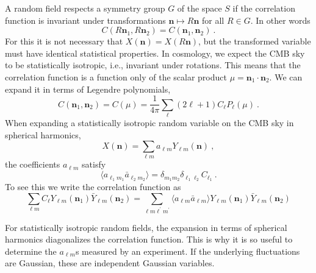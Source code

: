 \documentclass[12pt,a4paper]{article}
\renewcommand{\vec}[1]{\boldsymbol{#1}}
\begin{document}
A random field respects a symmetry group $G$ of the space $S$ if the correlation function is invariant under transformations $\vec{n} \mapsto R\vec{n}$ for all $R \in G$. In other words
\begin{equation}
C(R\vec{n}_1, R\vec{n}_2) = C(\vec{n}_1, \vec{n}_2) ~.
\end{equation}
For this it is not necessary that $X(\vec{n}) = X(R\vec{n})$, but the transformed variable must have identical statistical properties. In cosmology, we expect the CMB sky to be statistically isotropic, i.e., invariant under rotations. This means that the correlation function is a function only of the scalar product $\mu = \vec{n}_1 \cdot \vec{n}_2$. We can expand it in terms of Legendre polynomials,
\begin{equation}
C(\vec{n}_1, \vec{n}_2) = C(\mu) = \dfrac{1}{4\pi} \sum_\ell (2\ell +1) C_\ell P_\ell (\mu) ~.
\end{equation}
When expanding a statistically isotropic random variable on the CMB sky in spherical harmonics,
\begin{equation}
X(\vec{n}) = \sum_{\ell m} a_{\ell m} Y_{\ell m} (\vec{n}) ~,
\end{equation}
the coefficients $a_{\ell m}$ satisfy
\begin{equation}
\langle a_{\ell_1 m_1} \bar{a}_{\ell_2 m_2} \rangle = \delta_{m_1 m_2} \delta_{\ell_1 \ell_2} C_{\ell_1} ~.
\end{equation}
To see this we write the correlation function as
\begin{equation}
\sum_{\ell m} C_{\ell} Y_{\ell m}(\vec{n}_1) \bar{Y}_{\ell m}(\vec{n}_2) = \sum_{\ell m \ell^\prime m^\prime} \langle a_{\ell m} \bar{a}_{\ell m} \rangle Y_{\ell m}(\vec{n}_1) \bar{Y}_{\ell m}(\vec{n}_2)
\end{equation}


For statistically isotropic random fields, the expansion in terms of spherical harmonics diagonalizes the correlation function. This is why it is so useful to determine the $a_{\ell m}$s measured by an experiment. If the underlying fluctuations are Gaussian, these are independent Gaussian variables.
\end{document}
